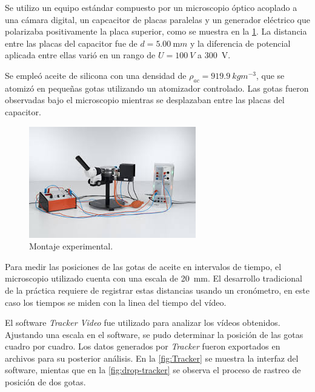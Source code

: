 Se utilizo un equipo estándar compuesto por un microscopio óptico acoplado a
una cámara digital, un capcacitor de placas paralelas y un generador eléctrico
que polarizaba positivamente la placa superior, como se muestra en la
\cref{fig:set-up}.
La distancia entre las placas del capacitor fue de \(d = \qty{5.00}{\milli m}\)
y la diferencia de potencial aplicada entre ellas varió en un rango de
\( U = \qty{100}{V} \) a \qty{300}{V}.

Se empleó aceite de silicona con una densidad de
\( \rho_{ac} = \qty{919.9}{kgm^{-3}} \), que se atomizó en pequeñas gotas
utilizando un atomizador controlado.
Las gotas fueron observadas bajo el microscopio mientras se desplazaban entre
las placas del capacitor.

\begin{figure}[htbp!]
    \centering
    \includegraphics[width=0.8\linewidth]{./images/Montaje-Experimental.jpeg}
    \caption{Montaje experimental.}
    \label{fig:set-up}
\end{figure}

Para medir las posiciones de las gotas de aceite en intervalos de tiempo, el
microscopio utilizado cuenta con una escala de \qty{20}{\milli m}.
El desarrollo tradicional de la práctica requiere de registrar estas distancias
usando un cronómetro, en este caso los tiempos se miden con la linea del tiempo
del vídeo.

El software \emph{Tracker Video} fue utilizado para analizar los vídeos obtenidos.
Ajustando una escala en el software, se pudo determinar la posición de las gotas
cuadro por cuadro.
Los datos generados por \emph{Tracker} fueron exportados en archivos para su
posterior análisis.
En la \cref{fig:Tracker} se muestra la interfaz del software, mientas que en la
\cref{fig:drop-tracker} se observa el proceso de rastreo de posición de dos
gotas.


